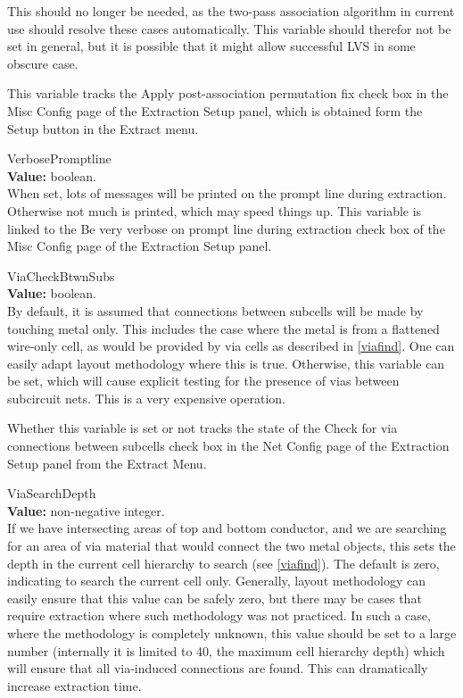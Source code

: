 \begin{description}
This should no longer be needed, as the two-pass association algorithm
in current use should resolve these cases automatically.  This
variable should therefor not be set in general, but it is possible
that it might allow successful LVS in some obscure case.
 
This variable tracks the {\cb Apply post-association permutation fix}
check box in the {\cb Misc Config} page of the {\cb Extraction Setup}
panel, which is obtained form the {\cb Setup} button in the {\cb
Extract menu}.

\item{\et VerbosePromptline}\\
{\bf Value:} boolean.\\
When set, lots of messages will be printed on the prompt line during
extraction.  Otherwise not much is printed, which may speed things up. 
This variable is linked to the {\cb Be very verbose on prompt line
during extraction} check box of the {\cb Misc Config} page of the {\cb
Extraction Setup} panel.

\item{\et ViaCheckBtwnSubs}\\
{\bf Value:} boolean.\\
By default, it is assumed that connections between subcells will be
made by touching metal only.  This includes the case where the metal
is from a flattened wire-only cell, as would be provided by via cells
as described in \ref{viafind}.  One can easily adapt layout
methodology where this is true.  Otherwise, this variable can be set,
which will cause explicit testing for the presence of vias between
subcircuit nets.  This is a very expensive operation.

Whether this variable is set or not tracks the state of the {\cb Check
for via connections between subcells} check box in the {\cb Net
Config} page of the {\cb Extraction Setup} panel from the {\cb Extract
Menu}.

\item{\et ViaSearchDepth}\\
{\bf Value:} non-negative integer.\\
If we have intersecting areas of top and bottom conductor, and we are
searching for an area of via material that would connect the two metal
objects, this sets the depth in the current cell hierarchy to search
(see \ref{viafind}).  The default is zero, indicating to search the
current cell only.  Generally, layout methodology can easily ensure
that this value can be safely zero, but there may be cases that
require extraction where such methodology was not practiced.  In such
a case, where the methodology is completely unknown, this value should
be set to a large number (internally it is limited to 40, the maximum
cell hierarchy depth) which will ensure that all via-induced
connections are found.  This can dramatically increase extraction
time.


\end{description}
